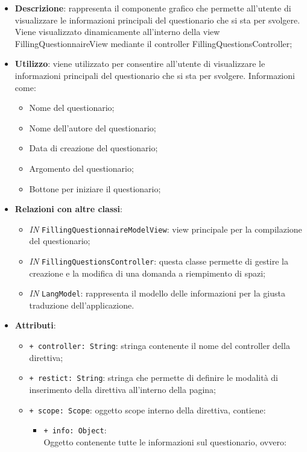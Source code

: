 		\begin{itemize}
			\item \textbf{Descrizione}: rappresenta il componente grafico che permette all'utente di visualizzare le informazioni principali del questionario che si sta per svolgere. Viene visualizzato dinamicamente all'interno della view FillingQuestionnaireView mediante il controller FillingQuestionsController;
			\item \textbf{Utilizzo}: viene utilizzato per consentire all'utente di visualizzare le informazioni principali del questionario che si sta per svolgere. Informazioni come:
			\begin{itemize}
				\item Nome del questionario;
				\item Nome dell'autore del questionario;
				\item Data di creazione del questionario;
				\item Argomento del questionario;
				\item Bottone per iniziare il questionario;
			\end{itemize}
			\item \textbf{Relazioni con altre classi}: 
			\begin{itemize}
				\item \textit{IN} \texttt{FillingQuestionnaireModelView}: view principale per la compilazione del questionario;
				\item \textit{IN} \texttt{FillingQuestionsController}: questa classe permette di gestire la creazione e la modifica di una domanda a riempimento di spazi;
				\item \textit{IN} \texttt{LangModel}: rappresenta il modello delle informazioni per la giusta traduzione dell'applicazione.
			\end{itemize}
			\item \textbf{Attributi}: 
			\begin{itemize}
				\item \texttt{+ controller: String}: stringa contenente il nome del controller della direttiva;
				\item \texttt{+ restict: String}: stringa che permette di definire le modalità di inserimento della direttiva all'interno della pagina;
				\item \texttt{+ scope: Scope}: oggetto scope interno della direttiva, contiene:
				\begin{itemize}
					\item \texttt{+ info: Object}: \\ Oggetto contenente tutte le informazioni sul questionario, ovvero:

\end{itemize}
\end{itemize}
\end{itemize}
